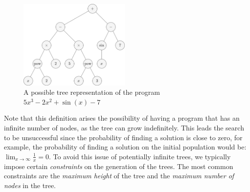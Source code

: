   \begin{figure}[ht!]
    \centering
    \includegraphics[width=0.4875\textwidth]{img/theoretical_framework/Expected Expression Tree.png}
    \caption{
      A possible tree representation of the program \(5x^3 - 2x^2 + \sin(x) - 7\)
    }
    \label{fig:bg:gp:repr_ev:tree}
  \end{figure}

  Note that this definition arises the possibility of having a program that
  has an infinite number of nodes, as the tree can grow indefinitely.
  This leads the search to be unsuccessful since the probability of finding a
  solution is close to zero, for example, the probability of finding a solution
  on the initial population would be: \(\lim_{x \to \infty} \frac{1}{x} = 0\).
  To avoid this issue of potentially infinite trees, we typically impose certain
  \emph{constraints} on the generation of the trees.
  The most common constraints are the \emph{maximum height} of the tree and the
  \emph{maximum number of nodes} in the tree.
